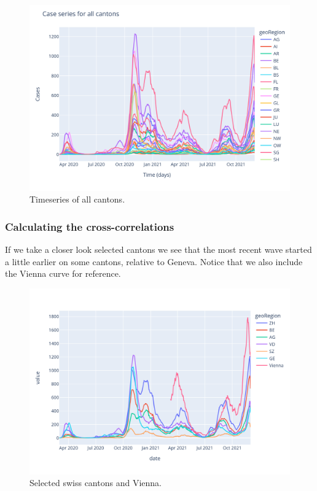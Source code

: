 \documentclass[11pt]{article}
\begin{document}
\begin{figure}
 \centering
 \includegraphics[width=\linewidth]{canton_series.png}
 \caption{Timeseries of all cantons.}
 \label{fig:canton_series}
\end{figure}

    
    
    \hypertarget{calculating-the-cross-correlations}{%
\subsubsection{Calculating the
cross-correlations}\label{calculating-the-cross-correlations}}

If we take a closer look selected cantons we see that the most recent
wave started a little earlier on some cantons, relative to Geneva.
Notice that we also include the Vienna curve for reference.

\begin{figure}
 \centering
 \includegraphics[width=\linewidth]{lagged_series.png}
 \caption{Selected swiss cantons and Vienna.}
 \label{fig:lagged series}
\end{figure}
\end{document}

